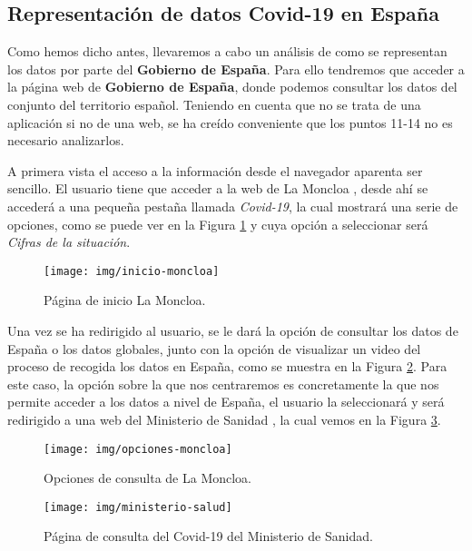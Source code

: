\subsection{Representación de datos Covid-19 en España}

Como hemos dicho antes, llevaremos a cabo un análisis de como se representan los datos por parte del \textbf{Gobierno de España}. Para ello tendremos que acceder a la página web de \textbf{Gobierno de España}, donde podemos consultar los datos del conjunto del territorio español. Teniendo en cuenta que no se trata de una aplicación si no de una web, se ha creído conveniente que los puntos 11-14 no es necesario analizarlos.

A primera vista el acceso a la información desde el navegador aparenta ser sencillo. El usuario tiene que acceder a la web de La Moncloa \cite{la-moncloa}, desde ahí se accederá a una pequeña pestaña llamada \textit{Covid-19}, la cual mostrará una serie de opciones, como se puede ver en la Figura \ref{fig:inicio-moncloa} y cuya opción a seleccionar será \textit{Cifras de la situación}.

\begin{figure}[H]
	\centering
	\texttt{[image: img/inicio-moncloa]}
	\caption{Página de inicio La Moncloa.}
	\label{fig:inicio-moncloa}
\end{figure}

\newpage
Una vez se ha redirigido al usuario, se le dará la opción de consultar los datos de España o los datos globales, junto con la opción de visualizar un video del proceso de recogida los datos en España, como se muestra en la Figura \ref{fig:opciones-moncloa}. Para este caso, la opción sobre la que nos centraremos es concretamente la que nos permite acceder a los datos a nivel de España, el usuario la seleccionará y será redirigido a una web del Ministerio de Sanidad \cite{gob-espana}, la cual vemos en la Figura \ref{fig:ministerio-salud}.

\begin{figure}[H]
	\centering
	\texttt{[image: img/opciones-moncloa]}
	\caption{Opciones de consulta de La Moncloa.}
	\label{fig:opciones-moncloa}
\end{figure}

\begin{figure}[H]
	\centering
	\texttt{[image: img/ministerio-salud]}
	\caption{Página de consulta del Covid-19 del Ministerio de Sanidad.}
	\label{fig:ministerio-salud}
\end{figure}

